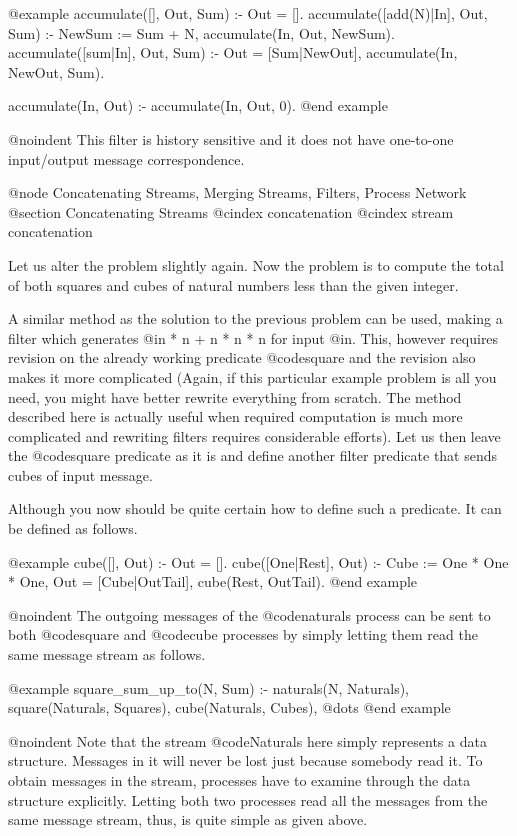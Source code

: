 {@example
accumulate([], Out, Sum) :- Out = [].
accumulate([add(N)|In], Out, Sum) :-
    NewSum := Sum + N,
    accumulate(In, Out, NewSum).
accumulate([sum|In], Out, Sum) :-
    Out = [Sum|NewOut],
    accumulate(In, NewOut, Sum).

accumulate(In, Out) :- accumulate(In, Out, 0).
@end example

@noindent
This filter is history sensitive and it does not have one-to-one
input/output message correspondence.

@node Concatenating Streams, Merging Streams, Filters, Process Network
@section Concatenating Streams
@cindex concatenation
@cindex stream concatenation

Let us alter the problem slightly again.  Now the problem is to compute
the total of both squares and cubes of natural numbers less than the
given integer.

A similar method as the solution to the previous problem can be used,
making a filter which generates @i{n * n + n * n * n} for input @i{n}.
This, however requires revision on the already working predicate
@code{square} and the revision also makes it more complicated (Again, if
this particular example problem is all you need, you might have better
rewrite everything from scratch.  The method described here is actually
useful when required computation is much more complicated and rewriting
filters requires considerable efforts).  Let us then leave the
@code{square} predicate as it is and define another filter predicate
that sends cubes of input message.

Although you now should be quite certain how to define such a predicate.
It can be defined as follows.

@example
cube([], Out) :- Out = [].
cube([One|Rest], Out) :-
    Cube := One * One * One,
    Out = [Cube|OutTail],
    cube(Rest, OutTail).
@end example

@noindent
The outgoing messages of the @code{naturals} process can be sent to both
@code{square} and @code{cube} processes by simply letting them read the
same message stream as follows.

@example
square_sum_up_to(N, Sum) :-
    naturals(N, Naturals),
    square(Naturals, Squares),
    cube(Naturals, Cubes),
    @dots{}
@end example

@noindent
Note that the stream @code{Naturals} here simply represents a data
structure.  Messages in it will never be lost just because somebody read
it.  To obtain messages in the stream, processes have to examine through
the data structure explicitly.  Letting both two processes read all the
messages from the same message stream, thus, is quite simple as given
above.

}
